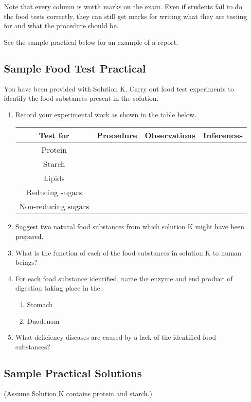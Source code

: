 \begin{itemize}
Note that every column is worth marks on the exam. Even if students fail to do the food tests correctly, they can still get marks for writing what they are testing for and what the procedure should be.

See the sample practical below for an example of a report.

\subsection{Sample Food Test Practical}

You have been provided with Solution K. Carry out food test experiments to identify the food substances present in the solution.
\begin{enumerate}

\item{Record your experimental work as shown in the table below.}

\begin{center}
\begin{tabular}{| c | c | c | c |}
\hline
Test for & Procedure & Observations & Inferences\\ \hline
Protein & & & \\ \hline
Starch & & & \\ \hline
Lipids & & & \\ \hline
Reducing sugars & & & \\ \hline
Non-reducing sugars & & & \\ \hline
\hline
\end{tabular}
\end{center}

\item{Suggest two natural food substances from which solution K might have been prepared.}
\item{What is the function of each of the food substances in solution K to human beings?}
\item{For each food substance identified, name the enzyme and end product of digestion taking place in the:}
\begin{enumerate}
\item{Stomach}
\item{Duodenum}
\end{enumerate}
\item{What deficiency diseases are caused by a lack of the identified food substances?}
\end{enumerate}

\subsection{Sample Practical Solutions}
(Assume Solution K contains protein and starch.)


\end{itemize}
